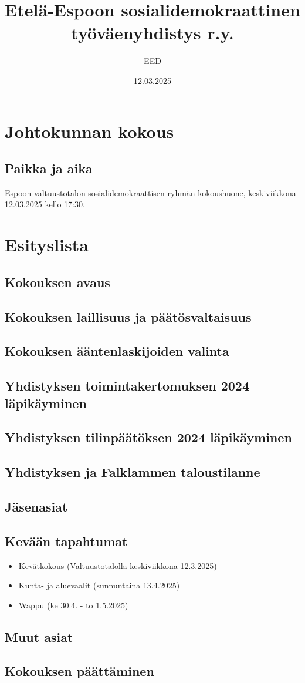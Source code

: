 \documentclass[a4paper,12pt]{article}
\title{Etelä-Espoon sosialidemokraattinen työväenyhdistys r.y.}
\author{EED}
\date{12.03.2025}
\begin{document}
\maketitle
\tableofcontents
\section*{Johtokunnan kokous}
\subsection*{Paikka ja aika}
Espoon valtuustotalon sosialidemokraattisen ryhmän kokoushuone, keskiviikkona 12.03.2025 kello 17:30.
\section*{Esityslista}
\subsection{Kokouksen avaus}
\subsection{Kokouksen laillisuus ja päätösvaltaisuus}
\subsection{Kokouksen ääntenlaskijoiden valinta}
\subsection{Yhdistyksen toimintakertomuksen 2024 läpikäyminen}
\subsection{Yhdistyksen tilinpäätöksen 2024 läpikäyminen}
\subsection{Yhdistyksen ja Falklammen taloustilanne}
\subsection{Jäsenasiat}
\subsection{Kevään tapahtumat}
\begin{itemize}
\item{Kevätkokous} (Valtuustotalolla keskiviikkona 12.3.2025)
\item{Kunta- ja aluevaalit} (sunnuntaina 13.4.2025)
\item{Wappu} (ke 30.4. - to 1.5.2025)
\end{itemize}
\subsection{Muut asiat}
\subsection{Kokouksen päättäminen}
\end{document}
